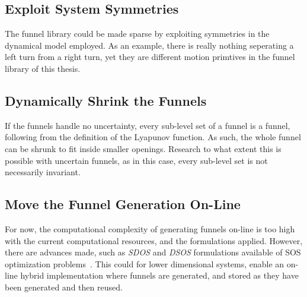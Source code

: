 \subsection{Exploit System Symmetries}

The funnel library could be made sparse by exploiting symmetries in the
dynamical model employed. As an example, there is really nothing seperating a
left turn from a right turn, yet they are different motion primtives in the
funnel library of this thesis.

\subsection{Dynamically Shrink the Funnels}

If the funnels handle no uncertainty, every sub-level set of a funnel is a
funnel, following from the definition of the Lyapunov function. As such, the whole funnel can be shrunk to fit inside smaller
openings. Research to what extent this is possible with uncertain funnels, as in
this case, every sub-level set is not necessarily invariant.

\subsection{Move the Funnel Generation On-Line}

For now, the computational complexity of generating funnels on-line is too high
with the current computational resources, and the formulations applied. However,
there are advances made, such as \textit{SDOS} and \textit{DSOS} formulations
available of \ac{SOS} optimization problems~\cite{ahmadi2014dsos}. This could
for lower dimensional systems, enable an on-line hybrid implementation where
funnels are generated, and stored as they have been generated and then reused.




